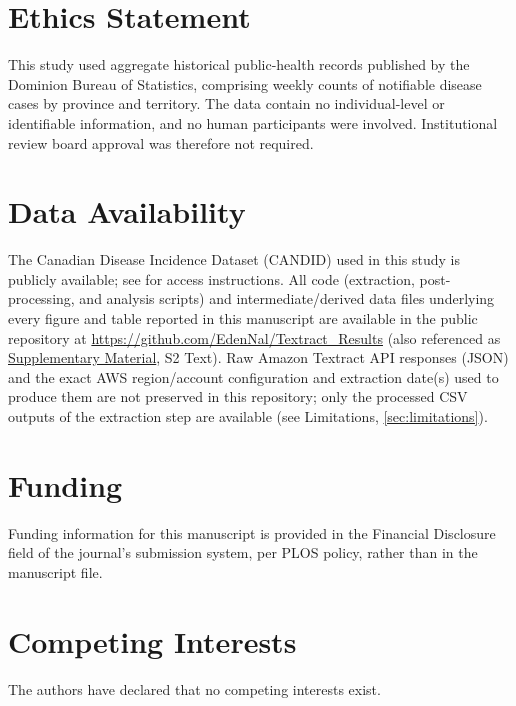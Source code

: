 \documentclass[12pt]{article}
\begin{document}
\section*{Ethics Statement}
This study used aggregate historical public-health records published by the Dominion Bureau of Statistics, comprising weekly counts of notifiable disease cases by province and territory. The data contain no individual-level or identifiable information, and no human participants were involved. Institutional review board approval was therefore not required.

\section*{Data Availability}
The Canadian Disease Incidence Dataset (CANDID) used in this study is publicly available; see \cite{CANDID} for access instructions. All code (extraction, post-processing, and analysis scripts) and intermediate/derived data files underlying every figure and table reported in this manuscript are available in the public repository at \url{https://github.com/EdenNal/Textract_Results} (also referenced as \hyperref[sec:supp]{Supplementary Material}, S2 Text). Raw Amazon Textract API responses (JSON) and the exact AWS region/account configuration and extraction date(s) used to produce them are not preserved in this repository; only the processed CSV outputs of the extraction step are available (see Limitations, \cref{sec:limitations}).

\section*{Funding}
Funding information for this manuscript is provided in the Financial Disclosure field of the journal's submission system, per PLOS policy, rather than in the manuscript file.

\section*{Competing Interests}
The authors have declared that no competing interests exist.
\end{document}
